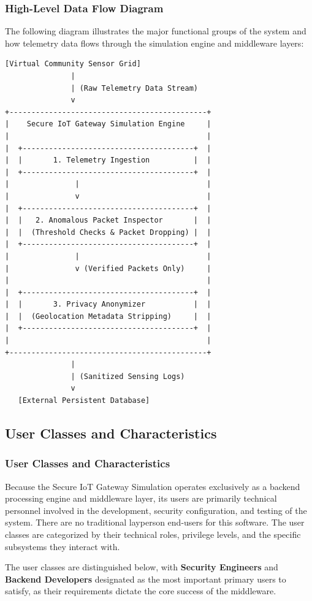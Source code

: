 \documentclass[12pt,letterpaper]{article}
\begin{document}
\subsubsection{High-Level Data Flow Diagram}
The following diagram illustrates the major functional groups of the system and how telemetry data flows through the simulation engine and middleware layers:\par
\begin{Verbatim}[fontsize=\fontsize{10}{10.5}\selectfont]
[Virtual Community Sensor Grid]
               |
               | (Raw Telemetry Data Stream)
               v
+---------------------------------------------+
|    Secure IoT Gateway Simulation Engine     |
|                                             |
|  +---------------------------------------+  |
|  |       1. Telemetry Ingestion          |  |
|  +---------------------------------------+  |
|               |                             |
|               v                             |
|  +---------------------------------------+  |
|  |   2. Anomalous Packet Inspector       |  |
|  |  (Threshold Checks & Packet Dropping) |  |
|  +---------------------------------------+  |
|               |                             |
|               v (Verified Packets Only)     |
|                                             |
|  +---------------------------------------+  |
|  |       3. Privacy Anonymizer           |  |
|  |  (Geolocation Metadata Stripping)     |  |
|  +---------------------------------------+  |
|                                             |
+---------------------------------------------+
               |
               | (Sanitized Sensing Logs)
               v
   [External Persistent Database]
\end{Verbatim}

\subsection{User Classes and Characteristics}
\subsubsection{User Classes and Characteristics}
Because the Secure IoT Gateway Simulation operates exclusively as a backend processing engine and middleware layer, its users are primarily technical personnel involved in the development, security configuration, and testing of the system. There are no traditional layperson end-users for this software. The user classes are categorized by their technical roles, privilege levels, and the specific subsystems they interact with.\par
The user classes are distinguished below, with \textbf{Security Engineers} and \textbf{Backend Developers} designated as the most important primary users to satisfy, as their requirements dictate the core success of the middleware.\par
\end{document}
